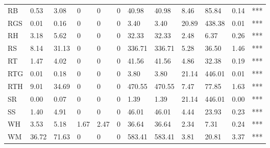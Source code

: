 \begin{table}[]
\begin{tabular}{llllllllllll}
RB   & 0.53   & 3.08   & 0      & 0     & 0   & 40.98   & 40.98   & 8.46  & 85.84    & 0.14  & ***              \\
RGS  & 0.01   & 0.16   & 0      & 0     & 0   & 3.40    & 3.40    & 20.89 & 438.38   & 0.01  & ***              \\
RH   & 3.18   & 5.62   & 0      & 0     & 0   & 32.33   & 32.33   & 2.48  & 6.37     & 0.26  & ***              \\
RS   & 8.14   & 31.13  & 0      & 0     & 0   & 336.71  & 336.71  & 5.28  & 36.50    & 1.46  & ***              \\
RT   & 1.47   & 4.02   & 0      & 0     & 0   & 41.56   & 41.56   & 4.86  & 32.38    & 0.19  & ***              \\
RTG  & 0.01   & 0.18   & 0      & 0     & 0   & 3.80    & 3.80    & 21.14 & 446.01   & 0.01  & ***              \\
RTH  & 9.01   & 34.69  & 0      & 0     & 0   & 470.55  & 470.55  & 7.47  & 77.85    & 1.63  & ***              \\
SR   & 0.00   & 0.07   & 0      & 0     & 0   & 1.39    & 1.39    & 21.14 & 446.01   & 0.00  & ***              \\
SS   & 1.40   & 4.91   & 0      & 0     & 0   & 46.01   & 46.01   & 4.44  & 23.93    & 0.23  & ***              \\
WH   & 3.53   & 5.18   & 1.67   & 2.47  & 0   & 36.64   & 36.64   & 2.34  & 7.31     & 0.24  & ***              \\
WM   & 36.72  & 71.63  & 0      & 0     & 0   & 583.41  & 583.41  & 3.81  & 20.81    & 3.37  & ***             
\end{tabular}
\end{table}
